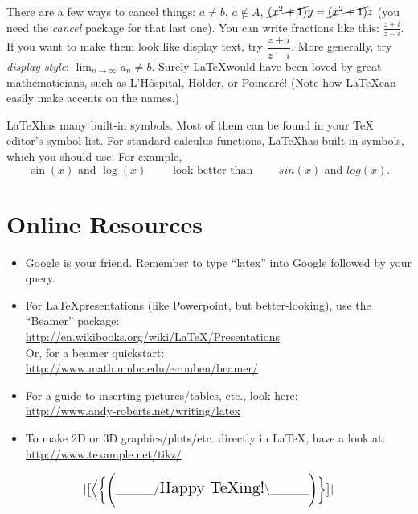 
\noindent There are a few ways to cancel things: 
$a\neq b$, $a\not\in A$, $\cancel{(x^2+1)}y=\cancel{(x^2+1)}z$ (you need the \emph{cancel} package for that last one).    
You can write fractions like this: $\frac{z+i}{z-i}$.  
If you want to make them look like display text, try $\dfrac{z+i}{z-i}$.  
More generally, try \emph{display style}: 
$\displaystyle{\lim_{n\rightarrow\infty}a_n}\neq b$. 
Surely \LaTeX would have been loved by great mathematicians, such as L'H\^ospital, H\"older, or Poincar\'e! (Note how \LaTeX can easily make accents on the names.)

\LaTeX has many built-in symbols.  Most of them can be found in your TeX editor's symbol list.  For standard calculus functions, \LaTeX has built-in symbols, which you should use.  For example, 
\[
 \sin(x) \text{ and } \log(x)
 \qquad\text{ look better than }\qquad
 sin(x) \text{ and } log(x).
\]

\section{Online Resources}

\begin{itemize}
\item Google is your friend.  Remember to type ``latex'' into Google followed by your query.
\item For \LaTeX presentations (like Powerpoint, but better-looking), use the ``Beamer'' package:\\
\url{http://en.wikibooks.org/wiki/LaTeX/Presentations}\\
Or, for a beamer quickstart:\\
\url{http://www.math.umbc.edu/~rouben/beamer/}
\item For a guide to inserting pictures/tables, etc., look here:\\ 
\url{http://www.andy-roberts.net/writing/latex}
\item To make 2D or 3D graphics/plots/etc. directly in \LaTeX, have a look at:\\
\url{http://www.texample.net/tikz/}

\end{itemize}


\begin{equation*}
|
\big[\Big<\bigg\{\Bigg(
\underline{\hspace{1.2cm}}
/ \text{\Large{Happy TeXing!}} \backslash
\underline{\hspace{1.2cm}}
\Bigg)\bigg\}\Big.\big]
|
\end{equation*}


\begin{scriptsize}

\end{scriptsize}



